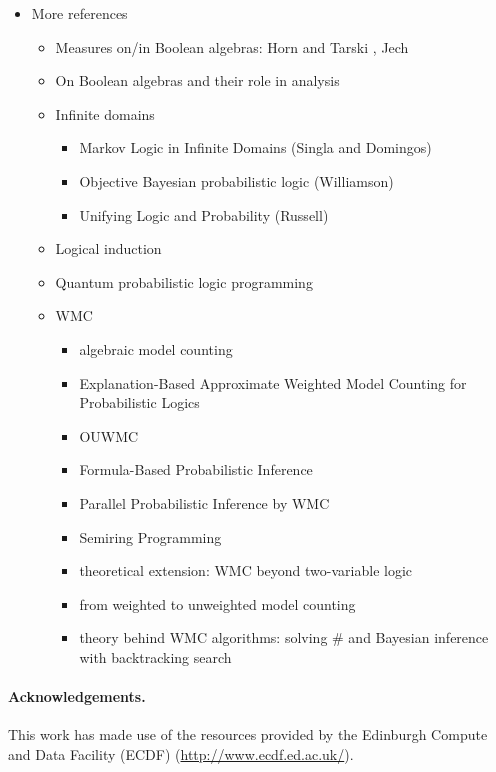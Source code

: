 \documentclass{article}
\theoremstyle{definition}
\theoremstyle{remark}
\begin{document}
\begin{itemize}
\item More references
  \begin{itemize}
  \item Measures on/in Boolean algebras: Horn and Tarski
    \cite{horn1948measures}, Jech \cite{jech2017measures}
  \item On Boolean algebras and their role in analysis \cite{winkowska1996boolean}
  \item Infinite domains
    \begin{itemize}
    \item Markov Logic in Infinite Domains (Singla and Domingos)
      \cite{DBLP:conf/uai/SinglaD07}
    \item Objective Bayesian probabilistic logic (Williamson)
      \cite{DBLP:journals/jal/Williamson08}
    \item Unifying Logic and Probability (Russell)
      \cite{DBLP:journals/cacm/Russell15}
    \end{itemize}
  \item Logical induction \cite{DBLP:journals/eccc/GarrabrantBCST16}
  \item Quantum probabilistic logic programming \cite{balu2015quantum}
  \item WMC
    \begin{itemize}
    \item algebraic model counting \cite{DBLP:journals/japll/KimmigBR17}
    \item Explanation-Based Approximate Weighted Model Counting for
      Probabilistic Logics \cite{DBLP:conf/aaai/RenkensKBR14}
    \item OUWMC \cite{DBLP:conf/aaai/Belle17}
    \item Formula-Based Probabilistic Inference \cite{DBLP:conf/uai/GogateD10}
    \item Parallel Probabilistic Inference by WMC \cite{DBLP:conf/pgm/DalLL18}
    \item Semiring Programming \cite{DBLP:journals/corr/BelleR16}
    \item theoretical extension: WMC beyond two-variable logic
      \cite{DBLP:conf/lics/KuusistoL18}
    \item from weighted to unweighted model counting
      \cite{DBLP:conf/ijcai/ChakrabortyFMV15}
    \item theory behind WMC algorithms: solving \#\SAT{} and Bayesian inference
      with backtracking search \cite{DBLP:journals/jair/BacchusDP09}
    \end{itemize}
  \end{itemize}
\end{itemize}

\paragraph{Acknowledgements.} This work has made use of the resources provided
by the Edinburgh Compute and Data Facility (ECDF)
(\url{http://www.ecdf.ed.ac.uk/}).



\end{document}
